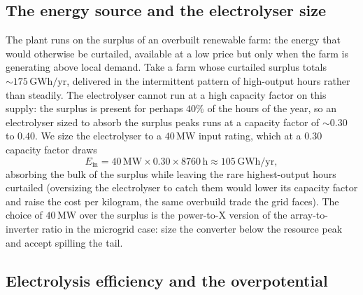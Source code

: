 \subsection{The energy source and the electrolyser size}

The plant runs on the surplus of an overbuilt renewable farm: the energy
that would otherwise be curtailed, available at a low price but only when
the farm is generating above local demand. Take a farm whose curtailed
surplus totals $\sim 175\,\si{\giga\watt\hour}/\text{yr}$, delivered in the
intermittent pattern of high-output hours rather than steadily. The
electrolyser cannot run at a high capacity factor on this supply: the
surplus is present for perhaps $40\%$ of the hours of the year, so an
electrolyser sized to absorb the surplus peaks runs at a capacity factor of
$\sim 0.30$ to $0.40$. We size the electrolyser to a $40\,\si{\mega\watt}$
input rating, which at a $0.30$ capacity factor draws
\[
E_{\text{in}} = 40\,\si{\mega\watt}\times 0.30\times 8760\,\si{\hour}
\approx 105\,\si{\giga\watt\hour}/\text{yr},
\]
absorbing the bulk of the surplus while leaving the rare highest-output
hours curtailed (oversizing the electrolyser to catch them would lower its
capacity factor and raise the cost per kilogram, the same overbuild trade
the grid faces). The choice of $40\,\si{\mega\watt}$ over the surplus is
the power-to-X version of the array-to-inverter ratio in the microgrid
case: size the converter below the resource peak and accept spilling the
tail.

\subsection{Electrolysis efficiency and the overpotential}

